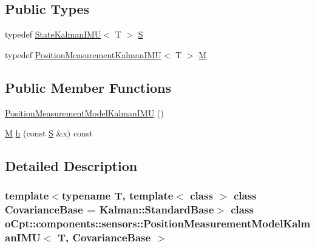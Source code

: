 \subsection*{Public Types}
\begin{DoxyCompactItemize}
\item 
typedef \hyperlink{classo_cpt_1_1components_1_1sensors_1_1_state_kalman_i_m_u}{State\+Kalman\+I\+MU}$<$ T $>$ \hyperlink{classo_cpt_1_1components_1_1sensors_1_1_position_measurement_model_kalman_i_m_u_a79b139fdb8d4569de9b5082297c3397f}{S}
\item 
typedef \hyperlink{classo_cpt_1_1components_1_1sensors_1_1_position_measurement_kalman_i_m_u}{Position\+Measurement\+Kalman\+I\+MU}$<$ T $>$ \hyperlink{classo_cpt_1_1components_1_1sensors_1_1_position_measurement_model_kalman_i_m_u_a8bf21cd63d26386aba33fd39299f96bf}{M}
\end{DoxyCompactItemize}
\subsection*{Public Member Functions}
\begin{DoxyCompactItemize}
\item 
\hyperlink{classo_cpt_1_1components_1_1sensors_1_1_position_measurement_model_kalman_i_m_u_a7b90dedbbcd5de7a65f4318dae1db29f}{Position\+Measurement\+Model\+Kalman\+I\+MU} ()
\item 
\hyperlink{classo_cpt_1_1components_1_1sensors_1_1_position_measurement_model_kalman_i_m_u_a8bf21cd63d26386aba33fd39299f96bf}{M} \hyperlink{classo_cpt_1_1components_1_1sensors_1_1_position_measurement_model_kalman_i_m_u_a2cc7f4c711ed5db5d24bd8c936c3195e}{h} (const \hyperlink{classo_cpt_1_1components_1_1sensors_1_1_position_measurement_model_kalman_i_m_u_a79b139fdb8d4569de9b5082297c3397f}{S} \&x) const
\end{DoxyCompactItemize}


\subsection{Detailed Description}
\subsubsection*{template$<$typename T, template$<$ class $>$ class Covariance\+Base = Kalman\+::\+Standard\+Base$>$\newline
class o\+Cpt\+::components\+::sensors\+::\+Position\+Measurement\+Model\+Kalman\+I\+M\+U$<$ T, Covariance\+Base $>$}



